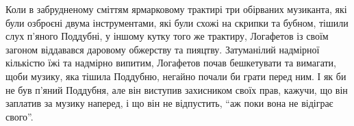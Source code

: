 \documentclass[a4paper,20pt]{report}
\begin{document}
Коли в забрудненому сміттям ярмарковому трактирі три обірваних музиканта, які
були озброєні двума інструментами, які були схожі на скрипки та бубном, тішили
слух п'яного Поддубні, у іншому кутку того же трактиру, Логафетов із своїм
загоном віддавався даровому обжерству та пияцтву. Затуманілий надмірної
кількістю їжі та надмірно випитим, Логафетов почав бешкетувати та вимагати,
щоби музику, яка тішила Поддубню, негайно почали би грати перед ним. І як би не
був п'яний Поддубня, але він виступив захисником своїх прав, кажучи, що він
заплатив за музику наперед, і що він не відпустить, ``аж поки вона не відіграє
свого''.

\end{document}
